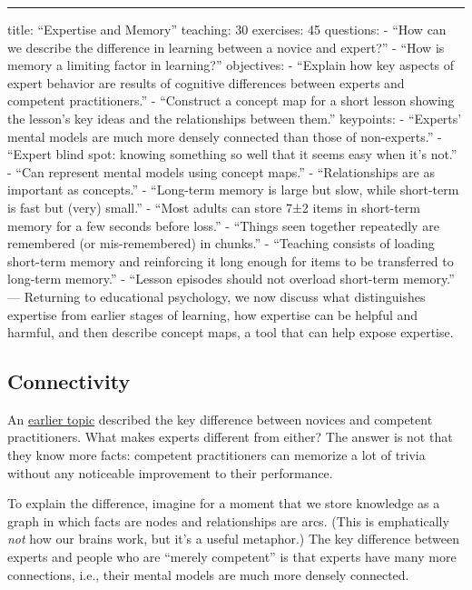 \begin{center}
\rule{3in}{0.4pt}
\end{center}
title: ``Expertise and Memory''
teaching: 30
exercises: 45
questions:
- ``How can we describe the difference in learning between a novice and expert?''
- ``How is memory a limiting factor in learning?''
objectives:
- ``Explain how key aspects of expert behavior are results of cognitive differences between experts and competent practitioners.''
- ``Construct a concept map for a short lesson showing the lesson's key ideas and the relationships between them.''
keypoints:
- ``Experts' mental models are much more densely connected than those of non-experts.''
- ``Expert blind spot: knowing something so well that it seems easy when it's not.''
- ``Can represent mental models using concept maps.''
- ``Relationships are as important as concepts.''
- ``Long-term memory is large but slow, while short-term is fast but (very) small.''
- ``Most adults can store 7±2 items in short-term memory for a few seconds before loss.''
- ``Things seen together repeatedly are remembered (or mis-remembered) in chunks.''
- ``Teaching consists of loading short-term memory and reinforcing it long enough for items to be transferred to long-term memory.''
- ``Lesson episodes should not overload short-term memory.''
---
Returning to educational psychology, we now discuss what distinguishes expertise
from earlier stages of learning, how expertise can be helpful and harmful, and then
describe concept maps, a tool that can help expose expertise.

\subsection*{Connectivity}

An \href{\{\{ page.root \}\}/03-novice/}{earlier topic} described the key difference between novices and competent practitioners.
What makes experts different from either?
The answer is not that they know more facts:
competent practitioners can memorize a lot of trivia
without any noticeable improvement to their performance.

To explain the difference,
imagine for a moment that we store knowledge as a graph
in which facts are nodes and relationships are arcs.
(This is emphatically \emph{not} how our brains work,
but it's a useful metaphor.)
The key difference between experts and people who are ``merely competent''
is that experts have many more connections,
i.e.,
their mental models are much more densely connected.

